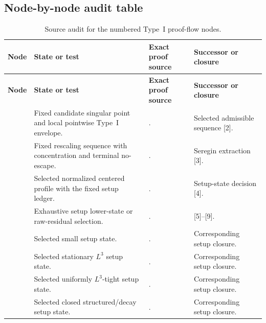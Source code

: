 \documentclass[11pt]{amsart}
\numberwithin{equation}{section}
\theoremstyle{plain}
\theoremstyle{definition}
\theoremstyle{remark}
\begin{document}
\subsection{Node-by-node audit table}

\begingroup
\scriptsize
\setlength{\tabcolsep}{2pt}
\renewcommand{\arraystretch}{1.16}
\begin{longtable}{@{}L{0.06\textwidth}L{0.25\textwidth}L{0.40\textwidth}L{0.21\textwidth}@{}}
\caption{Source audit for the numbered Type~I proof-flow nodes.}
\label{tab:typeI-proof-flow-node-audit}\\
\hline
\textbf{Node} & \textbf{State or test} & \textbf{Exact proof source} &
\textbf{Successor or closure}\\
\hline
\endfirsthead
\hline
\textbf{Node} & \textbf{State or test} & \textbf{Exact proof source} &
\textbf{Successor or closure}\\
\hline
\endhead
\hline
\endfoot
\relax
[1] & Fixed candidate singular point and local pointwise Type~I envelope. &
. &
Selected admissible sequence [2].\\
\relax
[2] & Fixed rescaling sequence with concentration and terminal no-escape. &
. &
Seregin extraction [3].\\
\relax
[3] & Selected normalized centered profile with the fixed setup ledger. &
. &
Setup-state decision [4].\\
\relax
[4] & Exhaustive setup lower-state or raw-residual selection. &
. &
[5]--[9].\\
\relax
[5] & Selected small setup state. &
. &
Corresponding setup closure.\\
\relax
[6] & Selected stationary \(L^3\) setup state. &
. &
Corresponding setup closure.\\
\relax
[7] & Selected uniformly \(L^3\)-tight setup state. &
. &
Corresponding setup closure.\\
\relax
[8] & Selected closed structured/decay setup state. &
. &
Corresponding setup closure.\\

\end{longtable}
\end{document}
